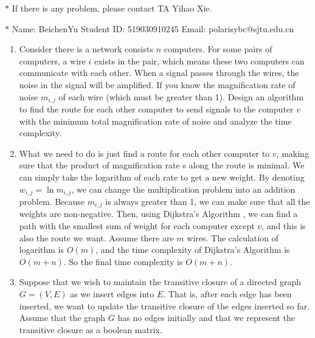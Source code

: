 \documentclass[12pt,a4paper]{article}
\makeatletter
\newtheorem*{solution}{Solution}
\theoremstyle{definition}
\renewenvironment{solution}[1][Solution] {\par\pushQED{\qed}\normalfont\topsep6\p@\@plus6\p@\relax\trivlist\item[\hskip\labelsep\bfseries#1\@addpunct{.}]\ignorespaces}{\popQED\endtrivlist\@endpefalse} \makeatother
\makeatother
\begin{document}
\noindent

\noindent{}
\begin{center}
\footnotesize{\color{red}$*$ If there is any problem, please contact TA Yihao Xie. }

\footnotesize{\color{blue}$*$ Name: BeichenYu  \quad Student ID: 519030910245 \quad Email: polarisybc@sjtu.edu.cn}
\end{center}

\begin{enumerate}
    \item  Consider there is a network consists $n$ computers. For some pairs of computers, a wire $i$ exists in the pair, which means these two computers can communicate with each other. When a signal passes through the wires, the noise in the signal will be amplified. If you know the magnification rate of noise $m_{i,j}$ of each wire (which must be greater than 1). Design an algorithm to find the route  for each other computer to send signals to the computer $v$ with the minimum total magnification rate of noise and analyze the time complexity.
	
	\begin{solution}
		What we need to do is just find a route for each other computer to $ v $, making sure that the product of magnification  rate s along the route is minimal. We can simply take the logarithm of each rate to get a new weight. By denoting $ w_{i,j} = \ln m_{i,j} $, we can change the multiplication problem into an addition problem. Because $ m_{i,j} $ is always greater than 1, we can make sure that all the weights are non-negative. Then, using Dijkstra's Algorithm , we can find a path with the smallest sum of weight for each computer except $ v $, and this is also the route we want. Assume there are $ m $ wires. The calculation of logarithm is $ O(m) $, and the time complexity of Dijkstra's Algorithm is $ O(m+n) $. So the final time complexity is $ O(m+n) $.
	\end{solution}

	\item Suppose that we wish to maintain the transitive closure of a directed graph $G=(V,E)$ as we insert edges into $E$. That is, after each edge has been inserted, we want to update the transitive closure of the edges inserted so far. Assume that the graph $G$ has no edges initially and that we represent the transitive closure as a boolean matrix.
	

\end{enumerate}
\end{document}
